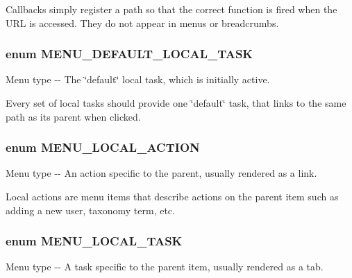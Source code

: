 Callbacks simply register a path so that the correct function is fired when the URL is accessed. They do not appear in menus or breadcrumbs. \hypertarget{group__menu__item__types_ga251e324e062f2e4c703f51231c0d7dc5}{
\subsubsection[{MENU\_\-DEFAULT\_\-LOCAL\_\-TASK}]{\setlength{\rightskip}{0pt plus 5cm}enum {\bf MENU\_\-DEFAULT\_\-LOCAL\_\-TASK}}}
\label{group__menu__item__types_ga251e324e062f2e4c703f51231c0d7dc5}
Menu type -\/-\/ The \char`\"{}default\char`\"{} local task, which is initially active.

Every set of local tasks should provide one \char`\"{}default\char`\"{} task, that links to the same path as its parent when clicked. \hypertarget{group__menu__item__types_gac627fc26dd1719748fa8aec50300ef16}{
\subsubsection[{MENU\_\-LOCAL\_\-ACTION}]{\setlength{\rightskip}{0pt plus 5cm}enum {\bf MENU\_\-LOCAL\_\-ACTION}}}
\label{group__menu__item__types_gac627fc26dd1719748fa8aec50300ef16}
Menu type -\/-\/ An action specific to the parent, usually rendered as a link.

Local actions are menu items that describe actions on the parent item such as adding a new user, taxonomy term, etc. \hypertarget{group__menu__item__types_ga4dc67226400f237bd3c0a5ef7126008b}{
\subsubsection[{MENU\_\-LOCAL\_\-TASK}]{\setlength{\rightskip}{0pt plus 5cm}enum {\bf MENU\_\-LOCAL\_\-TASK}}}
\label{group__menu__item__types_ga4dc67226400f237bd3c0a5ef7126008b}
Menu type -\/-\/ A task specific to the parent item, usually rendered as a tab.


